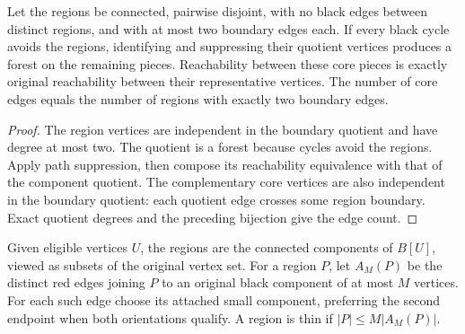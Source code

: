 \begin{theorem}
  \label{thm:lowerbounds-algebraic-core-forest}
  \leanok
  Let the regions be connected, pairwise disjoint, with no black edges
  between distinct regions, and with at most two boundary edges each.
  If every black cycle avoids the regions, identifying and suppressing
  their quotient vertices produces a forest on the remaining pieces.
  Reachability between these core pieces is exactly original reachability
  between their representative vertices.
  The number of core edges equals the number of regions with exactly
  two boundary edges.
\end{theorem}
\begin{proof}
  \leanok
  The region vertices are independent in the boundary quotient and have
  degree at most two. The quotient is a forest because cycles avoid the
  regions. Apply path suppression, then compose its reachability equivalence
  with that of the component quotient.
  The complementary core vertices are also independent in the boundary
  quotient: each quotient edge crosses some region boundary. Exact
  quotient degrees and the preceding bijection give the edge count.
\end{proof}

\begin{definition}
  \label{def:lowerbounds-algebraic-thin-path-system}
  \leanok
  Given eligible vertices $U$, the regions are the connected components
  of $B[U]$, viewed as subsets of the original vertex set. For a region
  $P$, let $A_M(P)$ be the distinct red edges joining $P$ to an original
  black component of at most $M$ vertices. For each such edge choose its
  attached small component, preferring the second endpoint when both
  orientations qualify. A region is thin if $|P|\le M|A_M(P)|$.
\end{definition}

